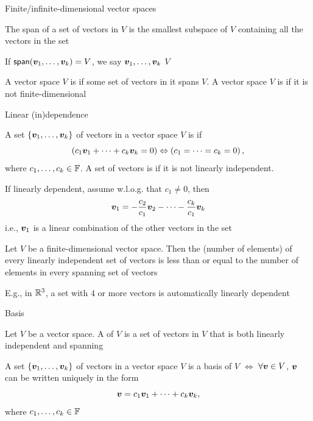 \documentclass[aspectratio=169]{beamer}\usepackage[]{graphicx}\usepackage[]{xcolor}
\begin{document}
\begin{frame}{Finite/infinite-dimensional vector spaces}
	\begin{theorem}
		The span of a set of vectors in $V$ is the smallest subspace of $V$ containing all the vectors in the set
	\end{theorem}
	\vfill
	\begin{definition}
		If $\mathsf{span}(\bm{v}_1,\ldots,\bm{v}_k)=V$, we say $\bm{v}_1,\ldots,\bm{v}_k$  $V$
	\end{definition}
	\vfill
	\begin{definition}
		A vector space $V$ is  if some set of vectors in it spans $V$.
		A vector space $V$ is  if it is not finite-dimensional
	\end{definition}
\end{frame}


\begin{frame}{Linear (in)dependence}
	\begin{definition}
		A set $\{\bm{v}_1,\ldots,\bm{v}_k\}$ of vectors in a vector space $V$ is  if
		\[
		\left(c_1\bm{v}_1+\cdots+c_k\bm{v}_k=0\right)
		\Leftrightarrow
		\left(c_1=\cdots=c_k=0\right),
		\]
		where $c_1,\ldots,c_k\in\mathbb{F}$. 
		A set of vectors is  if it is not linearly independent.
	\end{definition}
	\vfill
	If linearly dependent, assume w.l.o.g. that $c_1\neq 0$, then
	\[
	\bm{v}_1 = -\frac{c_2}{c_1}\bm{v}_2-\cdots-\frac{c_k}{c_1}\bm{v}_k
	\]
	i.e., $\bm{v}_1$ is a linear combination of the other vectors in the set
\end{frame}


\begin{frame}
	\begin{theorem}
		Let $V$ be a finite-dimensional vector space. Then the  (number of elements) of every linearly independent set of vectors is less than or equal to the number of elements in every spanning set of vectors
	\end{theorem}
\vfill
E.g., in $\mathbb{R}^3$, a set with 4 or more vectors is automatically linearly dependent
\end{frame}


\begin{frame}{Basis}
	\begin{definition}[Basis]
		Let $V$ be a vector space. A  of $V$ is a set of vectors in $V$ that is both linearly independent and spanning
	\end{definition}
	\vfill
	\begin{theorem}
		A set $\{\bm{v}_1,\ldots,\bm{v}_k\}$ of vectors in a vector space $V$ is a basis of $V$ $\iff$ $\forall \bm{v}\in V$, $\bm{v}$ can be written uniquely in the form
		\[
		\bm{v}=c_1\bm{v}_1+\cdots+c_k\bm{v}_k,
		\]
		where $c_1,\ldots,c_k\in\mathbb{F}$
	\end{theorem}
\end{frame}
\end{document}
